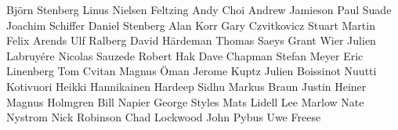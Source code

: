 \begin{center}
\begin{minipage}{16.15cm}
Bj\"orn Stenberg \newline
Linus Nielsen Feltzing \newline
Andy Choi \newline
Andrew Jamieson \newline
Paul Suade \newline
Joachim Schiffer \newline
Daniel Stenberg \newline
Alan Korr \newline
Gary Czvitkovicz \newline
Stuart Martin \newline
Felix Arends \newline
Ulf Ralberg \newline
David H\"ardeman \newline
Thomas Saeys \newline
Grant Wier \newline
Julien Labruy\'ere \newline
Nicolas Sauzede \newline
Robert Hak \newline
Dave Chapman \newline
Stefan Meyer \newline
Eric Linenberg \newline
Tom Cvitan \newline
Magnus \"Oman \newline
Jerome Kuptz \newline
Julien Boissinot \newline
Nuutti Kotivuori \newline
Heikki Hannikainen \newline
Hardeep Sidhu \newline
Markus Braun \newline
Justin Heiner \newline
Magnus Holmgren \newline
Bill Napier \newline
George Styles \newline
Mats Lidell \newline
Lee Marlow \newline
Nate Nystrom \newline
Nick Robinson \newline
Chad Lockwood \newline
John Pybus \newline
Uwe Freese \newline

\end{minipage}
\end{center}
